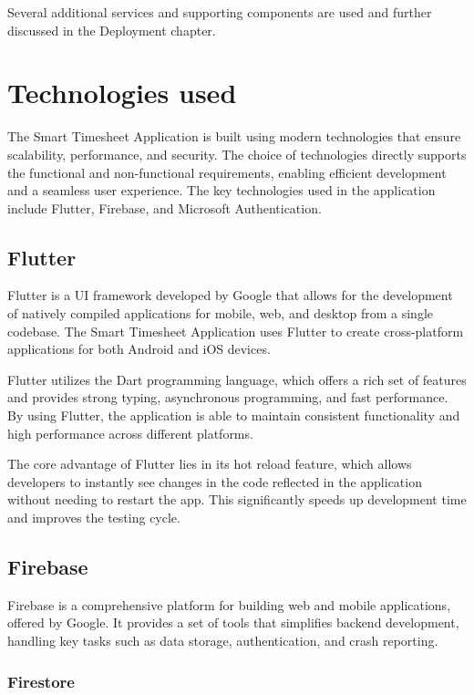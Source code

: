 \documentclass[
  digital,     %
  oneside,     %
  nosansbold,  %
  nocolorbold, %
  lof,         %
  lot,         %
]{fithesis4}
\begin{document}
Several additional services and supporting components are used and further discussed in the Deployment chapter. 

\shorthandon{-}

\chapter{Technologies used}

The Smart Timesheet Application is built using modern technologies that ensure scalability, performance, and security. The choice of technologies directly supports the functional and non-functional requirements, enabling efficient development and a seamless user experience. The key technologies used in the application include Flutter, Firebase, and Microsoft Authentication.

\section{Flutter}

Flutter is a UI framework developed by Google that allows for the development of natively compiled applications for mobile, web, and desktop from a single codebase. The Smart Timesheet Application uses Flutter to create cross-platform applications for both Android and iOS devices.

Flutter utilizes the Dart programming language, which offers a rich set of features and provides strong typing, asynchronous programming, and fast performance. By using Flutter, the application is able to maintain consistent functionality and high performance across different platforms.

The core advantage of Flutter lies in its hot reload feature, which allows developers to instantly see changes in the code reflected in the application without needing to restart the app. This significantly speeds up development time and improves the testing cycle.

\section{Firebase}

Firebase is a comprehensive platform for building web and mobile applications, offered by Google. It provides a set of tools that simplifies backend development, handling key tasks such as data storage, authentication, and crash reporting.

\subsection{Firestore}
\end{document}
